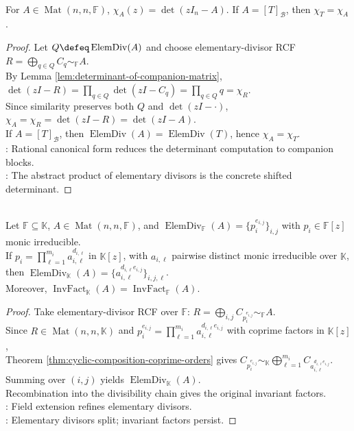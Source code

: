 \begin{theorem} \label{thm:determinant-form-characteristic-polynomial} \\
For $A\in\operatorname{Mat}(n,n,\mathbb{F})$, $\chi_A(z)=\det(zI_n-A)$. If $A=[T]_{\mathcal{B}}$, then $\chi_T=\chi_A$.
\begin{proof}
Let $Q\defeq\operatorname{ElemDiv}(A)$ and choose elementary-divisor RCF $R=\bigoplus_{q\in Q}C_q\sim_{\mathbb{F}}A$.\\
By Lemma \ref{lem:determinant-of-companion-matrix}, $\det(zI-R)=\prod_{q\in Q}\det(zI-C_q)=\prod_{q\in Q}q=\chi_R$.\\
Since similarity preserves both $Q$ and $\det(zI-\cdot)$, $\chi_A=\chi_R=\det(zI-R)=\det(zI-A)$.\\
If $A=[T]_{\mathcal{B}}$, then $\operatorname{ElemDiv}(A)=\operatorname{ElemDiv}(T)$, hence $\chi_A=\chi_T$.\\
: Rational canonical form reduces the determinant computation to companion blocks.\\
: The abstract product of elementary divisors is the concrete shifted determinant.
\end{proof}
\end{theorem}

\begin{theorem} \label{thm:base-field-change-elementary-divisors} \\
Let $\mathbb{F}\subseteq\mathbb{K}$, $A\in\operatorname{Mat}(n,n,\mathbb{F})$, and $\operatorname{ElemDiv}_{\mathbb{F}}(A)=\{p_i^{e_{i,j}}\}_{i,j}$ with $p_i\in\mathbb{F}[z]$ monic irreducible.\\
If $p_i=\prod_{\ell=1}^{m_i}a_{i,\ell}^{d_{i,\ell}}$ in $\mathbb{K}[z]$, with $a_{i,\ell}$ pairwise distinct monic irreducible over $\mathbb{K}$, then $\operatorname{ElemDiv}_{\mathbb{K}}(A)=\{a_{i,\ell}^{d_{i,\ell}e_{i,j}}\}_{i,j,\ell}$.\\
Moreover, $\operatorname{InvFact}_{\mathbb{K}}(A)=\operatorname{InvFact}_{\mathbb{F}}(A)$.
\begin{proof}
Take elementary-divisor RCF over $\mathbb{F}$: $R=\bigoplus_{i,j}C_{p_i^{e_{i,j}}}\sim_{\mathbb{F}}A$.\\
Since $R\in\operatorname{Mat}(n,n,\mathbb{K})$ and $p_i^{e_{i,j}}=\prod_{\ell=1}^{m_i}a_{i,\ell}^{d_{i,\ell}e_{i,j}}$ with coprime factors in $\mathbb{K}[z]$,\\
Theorem \ref{thm:cyclic-composition-coprime-orders} gives $C_{p_i^{e_{i,j}}}\sim_{\mathbb{K}}\bigoplus_{\ell=1}^{m_i}C_{a_{i,\ell}^{d_{i,\ell}e_{i,j}}}$. Summing over $(i,j)$ yields $\operatorname{ElemDiv}_{\mathbb{K}}(A)$.\\
Recombination into the divisibility chain gives the original invariant factors.\\
: Field extension refines elementary divisors.\\
: Elementary divisors split; invariant factors persist.
\end{proof}
\end{theorem}

